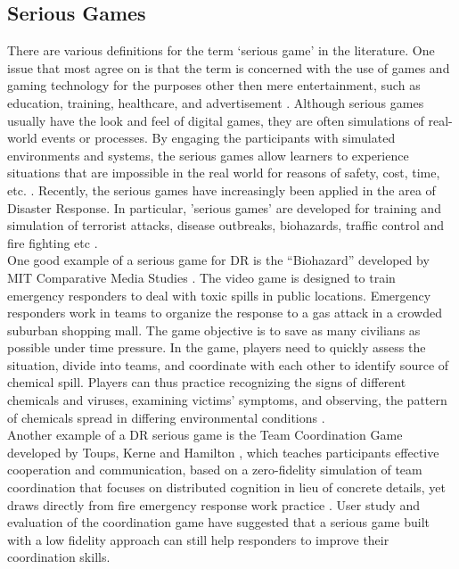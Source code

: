 \subsection{Serious Games}
There are various definitions for the term `serious game' in the literature. One issue that most agree on is that the term is concerned with the use of games and gaming technology for the purposes other then mere entertainment, such as education, training, healthcare, and advertisement \citep{Susi2007}. Although serious games usually have the look and feel of digital games, they are often simulations of real-world events or processes. By engaging the participants with simulated environments and systems, the serious games allow learners to experience situations that are impossible in the real world for reasons of safety, cost, time, etc. \citep{Squire2003,Meesters2013}. Recently, the serious games have increasingly been applied in the area of Disaster Response. In particular, 'serious games' are developed for training and simulation of terrorist attacks, disease outbreaks, biohazards, traffic control and fire fighting etc \citep{Susi2007,Squire2003}. \\

One good example of a serious game for \ac{DR} is the ``Biohazard'' developed by MIT Comparative Media Studies \citep{Squire2003}. The video game is designed to train emergency responders to deal with toxic spills in public locations. Emergency responders work in teams to organize the response to a gas attack in a crowded suburban shopping mall. The game objective is to save as many civilians as possible under time pressure. In the game,  players need to quickly assess the situation, divide into teams, and coordinate with each other to identify source of chemical spill. Players can thus practice recognizing the signs of different chemicals and viruses, examining victims' symptoms, and observing, the pattern of chemicals spread in differing environmental conditions \citep{Susi2007}.\\


Another example of a \ac{DR} serious game is the Team Coordination Game developed by Toups, Kerne and Hamilton \citep{Toups2011}, which teaches participants effective cooperation and communication, based on a zero-fidelity simulation of team coordination that focuses on distributed cognition in lieu of concrete details, yet draws directly from fire emergency response work practice \citep{Toups2011}. User study and evaluation of the coordination game have suggested that a serious game built with a low fidelity approach can still help responders to improve their coordination skills.\\


